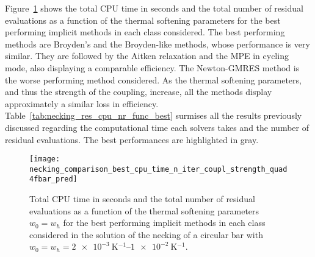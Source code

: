 Figure~\ref{fig:necking_comparison_best_cpu_time_n_iter_coupl_strength_quad4fbar_pred} shows the total CPU time in seconds and the total number of residual evaluations as a function of the thermal softening parameters for the best performing implicit methods in each class considered.
The best performing methods are Broyden's and the Broyden-like methods, whose performance is very similar.
They are followed by the Aitken relaxation and the MPE in cycling mode, also displaying a comparable efficiency.
The Newton-GMRES method is the worse performing method considered.
As the thermal softening parameters, and thus the strength of the coupling, increase, all the methods display approximately a similar loss in efficiency.
Table~\ref{tab:necking_res_cpu_nr_func_best} surmises all the results previously discussed regarding the computational time each solvers takes and the number of residual evaluations.
The best performances are highlighted in gray.

\begin{figure}[hbtp]
 \texttt{[image: necking\_comparison\_best\_cpu\_time\_n\_iter\_coupl\_strength\_quad4fbar\_pred]}
 \caption{Total CPU time in seconds and the total number of residual evaluations as a function of the thermal softening parameters \(w_0=w_h\) for the best performing implicit methods in each class considered in the solution of the necking of a circular bar with \(w_0=w_h=\SIrange{2e-3}{1e-2}{\kelvin^{-1}}\).}
\label{fig:necking_comparison_best_cpu_time_n_iter_coupl_strength_quad4fbar_pred}
\end{figure}

